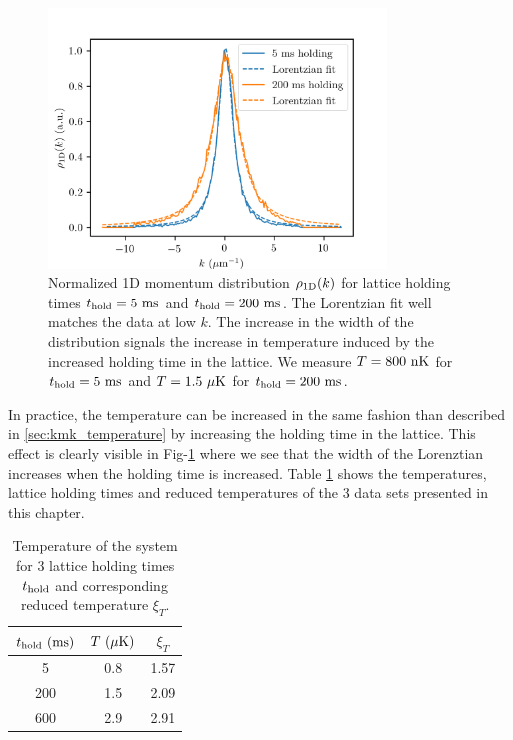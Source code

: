 \begin{figure}
    \centering
    \includegraphics[width=0.8\textwidth]{Fig/Chapter5/1D_temperature_lorentz.png}
    \caption{Normalized 1D momentum distribution $\rho_{\rm{1D}} (k)$ for lattice holding times $t_{\rm{hold}}=5 \ \rm{ms}$ and $t_{\rm{hold}}=200 \ \rm{ms}$. The Lorentzian fit well matches the data at low $k$. The increase in the width of the distribution signals the increase in temperature induced by the increased holding time in the lattice. We measure $T=800 \ \rm{nK}$ for $t_{\rm{hold}}=5 \ \rm{ms}$ and $T=1.5 \ \mu \rm{K}$ for $t_{\rm{hold}}=200 \ \rm{ms}$.}
    \label{fig:1D_temperature}
\end{figure}

In practice, the temperature can be increased in the same fashion than described in \ref{sec:kmk_temperature} by increasing the holding time in the lattice. This effect is clearly visible in Fig-\ref{fig:1D_temperature} where we see that the width of the Lorenztian increases when the holding time is increased. Table \ref{tab:T_vs_t_hold} shows the temperatures, lattice holding times and reduced temperatures of the 3 data sets presented in this chapter. 

\begin{table}[h!]
\centering
{
    \begin{tabular}{c|c|c}
        {\color{MainColor} $t_{\rm{hold}} \ (\rm{ms})$} &  {\color{MainColor}$T \ (\mu \rm{K})$} & {\color{MainColor}$\xi_T$} \\
        \hline
        5 & 0.8 & 1.57 \\
        200 & 1.5 & 2.09 \\
        600 & 2.9 & 2.91 \\
    \end{tabular}}
\caption{Temperature of the system for 3 lattice holding times $t_{\rm{hold}}$ and corresponding reduced temperature $\xi_T$.}
\label{tab:T_vs_t_hold}
\end{table}


